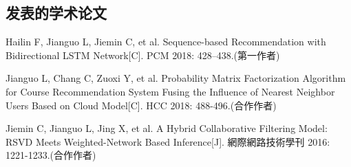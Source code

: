 ﻿%
\begin{resume}

  \section*{发表的学术论文} %

  \begin{enumerate}[{[}1{]}]
  \addtolength{\itemsep}{-.36\baselineskip}%
  \item Hailin F, Jianguo L, Jiemin C, et al. Sequence-based Recommendation with Bidirectional LSTM Network[C]. PCM 2018: 428--438.(第一作者)
  \item Jianguo L, Chang C, Zuoxi Y, et al. Probability Matrix Factorization Algorithm for Course Recommendation System Fusing the Influence of Nearest Neighbor Users Based on Cloud Model[C]. HCC 2018: 488-496.(合作作者)
  \item Jiemin C, Jianguo L, Jing X, et al. A Hybrid Collaborative Filtering Model: RSVD Meets Weighted-Network Based Inference[J]. 網際網路技術學刊 2016: 1221-1233.(合作作者)  
  \end{enumerate}

 
\end{resume}
